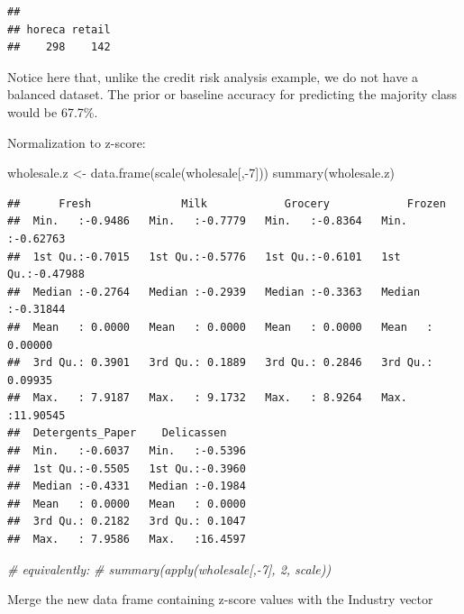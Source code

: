 \documentclass[
]{article}
\newenvironment{Shaded}{\begin{snugshade}}{\end{snugshade}}
\newcommand{\AttributeTok}[1]{\textcolor[rgb]{0.77,0.63,0.00}{#1}}
\newcommand{\CommentTok}[1]{\textcolor[rgb]{0.56,0.35,0.01}{\textit{#1}}}
\newcommand{\DecValTok}[1]{\textcolor[rgb]{0.00,0.00,0.81}{#1}}
\newcommand{\FunctionTok}[1]{\textcolor[rgb]{0.00,0.00,0.00}{#1}}
\newcommand{\NormalTok}[1]{#1}
\newcommand{\OtherTok}[1]{\textcolor[rgb]{0.56,0.35,0.01}{#1}}
\newcommand{\SpecialCharTok}[1]{\textcolor[rgb]{0.00,0.00,0.00}{#1}}
\begin{document}
\begin{verbatim}
## 
## horeca retail 
##    298    142
\end{verbatim}

Notice here that, unlike the credit risk analysis example, we do not
have a balanced dataset. The prior or baseline accuracy for predicting
the majority class would be 67.7\%.

Normalization to z-score:

\begin{Shaded}
\begin{Highlighting}[]
\NormalTok{wholesale.z }\OtherTok{\textless{}{-}} \FunctionTok{data.frame}\NormalTok{(}\FunctionTok{scale}\NormalTok{(wholesale[,}\SpecialCharTok{{-}}\DecValTok{7}\NormalTok{]))}
\FunctionTok{summary}\NormalTok{(wholesale.z)}
\end{Highlighting}
\end{Shaded}

\begin{verbatim}
##      Fresh              Milk            Grocery            Frozen        
##  Min.   :-0.9486   Min.   :-0.7779   Min.   :-0.8364   Min.   :-0.62763  
##  1st Qu.:-0.7015   1st Qu.:-0.5776   1st Qu.:-0.6101   1st Qu.:-0.47988  
##  Median :-0.2764   Median :-0.2939   Median :-0.3363   Median :-0.31844  
##  Mean   : 0.0000   Mean   : 0.0000   Mean   : 0.0000   Mean   : 0.00000  
##  3rd Qu.: 0.3901   3rd Qu.: 0.1889   3rd Qu.: 0.2846   3rd Qu.: 0.09935  
##  Max.   : 7.9187   Max.   : 9.1732   Max.   : 8.9264   Max.   :11.90545  
##  Detergents_Paper    Delicassen     
##  Min.   :-0.6037   Min.   :-0.5396  
##  1st Qu.:-0.5505   1st Qu.:-0.3960  
##  Median :-0.4331   Median :-0.1984  
##  Mean   : 0.0000   Mean   : 0.0000  
##  3rd Qu.: 0.2182   3rd Qu.: 0.1047  
##  Max.   : 7.9586   Max.   :16.4597
\end{verbatim}

\begin{Shaded}
\begin{Highlighting}[]
\CommentTok{\# equivalently:}
\CommentTok{\# summary(apply(wholesale[,{-}7], 2, scale))}
\end{Highlighting}
\end{Shaded}

Merge the new data frame containing z-score values with the Industry
vector

\begin{Shaded}
\end{Shaded}
\end{document}
